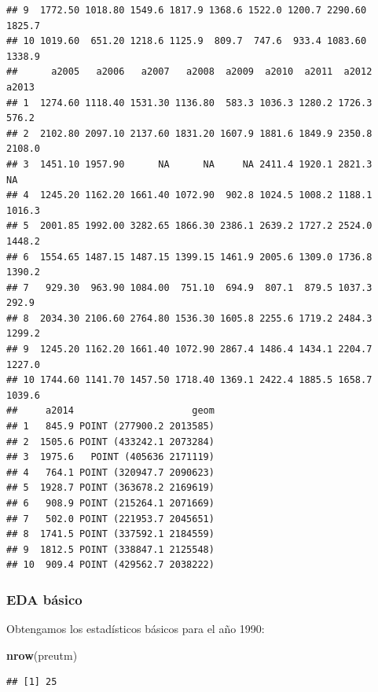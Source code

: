 \documentclass[11pt,]{article}
\newenvironment{Shaded}{\begin{snugshade}}{\end{snugshade}}
\newcommand{\KeywordTok}[1]{\textcolor[rgb]{0.13,0.29,0.53}{\textbf{#1}}}
\newcommand{\OperatorTok}[1]{\textcolor[rgb]{0.81,0.36,0.00}{\textbf{#1}}}
\newcommand{\NormalTok}[1]{#1}
\begin{document}
\begin{verbatim}
## 9  1772.50 1018.80 1549.6 1817.9 1368.6 1522.0 1200.7 2290.60 1825.7
## 10 1019.60  651.20 1218.6 1125.9  809.7  747.6  933.4 1083.60 1338.9
##      a2005   a2006   a2007   a2008  a2009  a2010  a2011  a2012  a2013
## 1  1274.60 1118.40 1531.30 1136.80  583.3 1036.3 1280.2 1726.3  576.2
## 2  2102.80 2097.10 2137.60 1831.20 1607.9 1881.6 1849.9 2350.8 2108.0
## 3  1451.10 1957.90      NA      NA     NA 2411.4 1920.1 2821.3     NA
## 4  1245.20 1162.20 1661.40 1072.90  902.8 1024.5 1008.2 1188.1 1016.3
## 5  2001.85 1992.00 3282.65 1866.30 2386.1 2639.2 1727.2 2524.0 1448.2
## 6  1554.65 1487.15 1487.15 1399.15 1461.9 2005.6 1309.0 1736.8 1390.2
## 7   929.30  963.90 1084.00  751.10  694.9  807.1  879.5 1037.3  292.9
## 8  2034.30 2106.60 2764.80 1536.30 1605.8 2255.6 1719.2 2484.3 1299.2
## 9  1245.20 1162.20 1661.40 1072.90 2867.4 1486.4 1434.1 2204.7 1227.0
## 10 1744.60 1141.70 1457.50 1718.40 1369.1 2422.4 1885.5 1658.7 1039.6
##     a2014                     geom
## 1   845.9 POINT (277900.2 2013585)
## 2  1505.6 POINT (433242.1 2073284)
## 3  1975.6   POINT (405636 2171119)
## 4   764.1 POINT (320947.7 2090623)
## 5  1928.7 POINT (363678.2 2169619)
## 6   908.9 POINT (215264.1 2071669)
## 7   502.0 POINT (221953.7 2045651)
## 8  1741.5 POINT (337592.1 2184559)
## 9  1812.5 POINT (338847.1 2125548)
## 10  909.4 POINT (429562.7 2038222)
\end{verbatim}

\subsubsection{EDA básico}\label{eda-buxe1sico}

Obtengamos los estadísticos básicos para el año 1990:

\begin{Shaded}
\begin{Highlighting}[]
\KeywordTok{nrow}\NormalTok{(preutm)}
\end{Highlighting}
\end{Shaded}

\begin{verbatim}
## [1] 25
\end{verbatim}

\begin{Shaded}
\end{Shaded}
\end{document}
